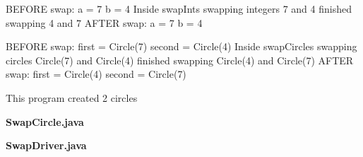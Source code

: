 \begin{answer}[14em]
\begin{minipage}{190pt}

\begin{javaans}
BEFORE swap:
a = 7
b = 4
    Inside swapInts
    swapping integers 7 and 4
    finished swapping 4 and 7
AFTER swap:
a = 7
b = 4
\end{javaans}

\end{minipage}
\hspace{1em}
\begin{minipage}{290pt}

\begin{javaans}
BEFORE swap:
first = Circle(7)
second = Circle(4)
	Inside swapCircles
	swapping circles Circle(7) and Circle(4)
	finished swapping Circle(4) and Circle(7)
AFTER swap:
first = Circle(4)
second = Circle(7)
\end{javaans}

\end{minipage}
\begin{javaans}
This program created 2 circles
\end{javaans}
\end{answer}


\newpage

\begin{center}
\large\bf SwapCircle.java
\vspace{-4pt}
\end{center}



\newpage

\begin{center}
\large\bf SwapDriver.java
\vspace{-4pt}
\end{center}

